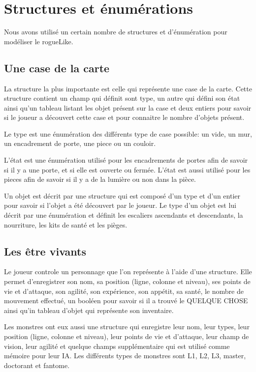 \documentclass[12pt]{report}
\begin{document}
	\section{Structures et énumérations}
	
	Nous avons utilisé un certain nombre de structures et d'énumération pour modéliser le rogueLike.
	
		\subsection{Une case de la carte}
	
		La structure la plus importante est celle qui représente une case de la carte. Cette structure contient un champ qui définit sont type, un autre qui défini son état ainsi qu'un tableau listant les objet présent sur la case et deux entiers pour savoir si le joueur a découvert cette case et pour connaitre le nombre d'objets présent.
	
		Le type est une énumération des différents type de case possible: un vide, un mur, un encadrement de porte, une piece ou un couloir.
	
		L'état est une énumération utilisé pour les encadrements de portes afin de savoir si il y a une porte, et si elle est ouverte ou fermée. L'état est aussi utilisé pour les pieces afin de savoir si il y a de la lumière ou non dans la pièce.
	
		Un objet est décrit par une structure qui est composé d'un type et d'un entier pour savoir si l'objet a été découvert par le joueur. Le type d'un objet est lui décrit par une énumération et définit les escaliers ascendants et descendants, la nourriture, les kits de santé et les pièges.
		
		\subsection{Les être vivants}
		
		Le joueur controle un personnage que l'on représente à l'aide d'une structure. Elle permet d'enregistrer son nom, sa position (ligne, colonne et niveau), ses points de vie et d'attaque, son agilité, son expérience, son appétit, sa santé, le nombre de mouvement effectué, un booléen pour savoir si il a trouvé le QUELQUE CHOSE ainsi qu'in tableau d'objet qui représente son inventaire.
		
		Les monstres ont eux aussi une structure qui enregistre leur nom, leur types, leur position (ligne, colonne et niveau), leur points de vie et d'attaque, leur champ de vision, leur agilité et quelque champs supplémentaire qui est utilisé comme mémoire pour leur IA. Les différents types de monstres sont L1, L2, L3, master, doctorant et fantome.
		
\end{document}
